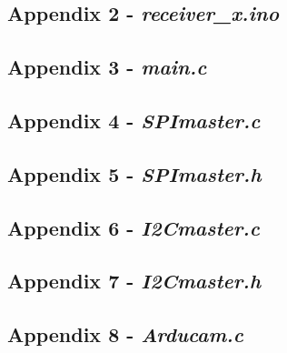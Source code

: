 

\newpage

\subsection{Appendix 2 - \textit{receiver\_x.ino}}\label{A2}



\newpage

\subsection{Appendix 3 - \textit{main.c}}\label{A3}



\newpage

\subsection{Appendix 4 - \textit{SPImaster.c}}\label{A4}



\newpage

\subsection{Appendix 5 - \textit{SPImaster.h}}\label{A5}



\newpage

\subsection{Appendix 6 - \textit{I2Cmaster.c}}\label{A6}



\newpage

\subsection{Appendix 7 - \textit{I2Cmaster.h}}\label{A7}



\newpage

\subsection{Appendix 8 - \textit{Arducam.c}}\label{A8}

